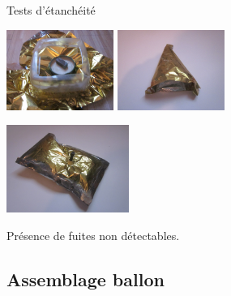 \begin{frame}{Tests d'étanchéité}

\begin{center}
    \includegraphics[width=3.5cm]{../Images/cloche_pet.JPG}
    \includegraphics[width=3.5cm]{../Images/cloche_colle.JPG}
\end{center}

\begin{center}
    \includegraphics[width=4cm]{../Images/ballon_etanche.JPG}
\end{center}

Présence de fuites non détectables.

\end{frame}


\subsection{Assemblage ballon}

